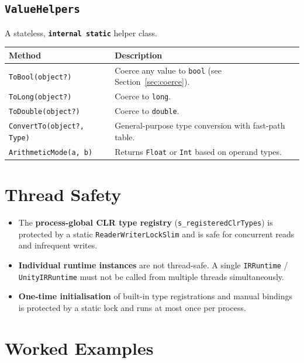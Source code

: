 \documentclass[11pt,a4paper]{article}
\newcommand{\code}[1]{\texttt{\small #1}}
\newcommand{\kword}[1]{\textbf{\texttt{\small #1}}}
\begin{document}
\subsection{\texttt{ValueHelpers}}

A stateless, \kword{internal static} helper class.

\begin{longtable}{lp{9cm}}
  \toprule
  \textbf{Method} & \textbf{Description} \\
  \midrule
  \endhead
  \code{ToBool(object?)}          & Coerce any value to \texttt{bool} (see Section~\ref{sec:coerce}). \\
  \code{ToLong(object?)}          & Coerce to \texttt{long}. \\
  \code{ToDouble(object?)}        & Coerce to \texttt{double}. \\
  \code{ConvertTo(object?, Type)} & General-purpose type conversion with fast-path table. \\
  \code{ArithmeticMode(a, b)}     & Returns \code{Float} or \code{Int} based on operand types. \\
  \bottomrule
\end{longtable}

\section{Thread Safety}

\begin{itemize}[leftmargin=1.8em]
  \item The \textbf{process-global CLR type registry}
    (\code{s\_registeredClrTypes}) is protected by a static
    \code{ReaderWriterLockSlim} and is safe for concurrent reads and
    infrequent writes.
  \item \textbf{Individual runtime instances} are not thread-safe. A single
    \code{IRRuntime} / \code{UnityIRRuntime} must not be called from multiple
    threads simultaneously.
  \item \textbf{One-time initialisation} of built-in type registrations and
    manual bindings is protected by a static lock and runs at most once per
    process.
\end{itemize}

\section{Worked Examples}
\end{document}
